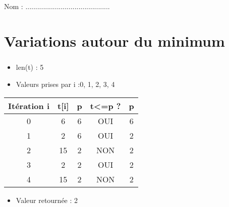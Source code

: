 \documentclass[10pt]{article}
\newif\ifprof
\newif\ifxp
\begin{document}
\ifxp

\else

\fi

\ifprof
\else
\begin{center}
\Large Nom  : ...........................................
\end{center}
\fi

 \renewcommand{\baselinestretch}{1.2}
\setlength{\parskip}{2ex plus 0.5ex minus 0.2ex}


\section{Variations autour du minimum}

\subparagraph{}
\textit{}%
\ifprof
\begin{corrige}
\begin{itemize}
\item \textsf{len(t)} : 5
\item Valeurs prises par \textsf{i} :0, 1, 2, 3, 4
\end{itemize}
\begin{center}
\begin{tabular} {|c||c|c||c|c|}
\hline
Itération \textsf{i} & \textsf{t[i]} & \textsf{p} & \textsf{t<=p} ? & p \\
\hline
0 & 6 & 6 & OUI & 6\\
1 & 2 & 6 & OUI & 2\\
2 & 15 & 2  & NON & 2\\
3 &  2 & 2 & OUI & 2\\
4 &  15 & 2 & NON & 2\\
\hline
\end{tabular}
\end{center}

\begin{itemize}
\item Valeur retournée : 2
\end{itemize}
\end{corrige}
\else
\end{document}
